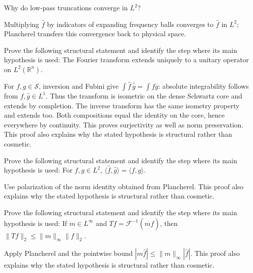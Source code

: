\begin{problem}\label{prob:iii13-problem-08}
Why do low-pass truncations converge in \(L^2\)?
\end{problem}
\begin{solution}
Multiplying \(\widehat f\) by indicators of expanding frequency balls
converges to \(\widehat f\) in \(L^2\); Plancherel transfers this convergence
back to physical space.
\end{solution}

\begin{problem}\label{prob:iii13-problem-09}
Prove the following structural statement and identify the step where its main hypothesis is used: The Fourier transform extends uniquely to a unitary operator on $L^2(\mathbb R^n)$.
\end{problem}
\begin{solution}
For $f,g\in\mathcal S$, inversion and Fubini give $\int\widehat f\,\overline{\widehat g}=\int f\overline g$: absolute integrability follows from $f,\widehat g\in L^1$. Thus the transform is isometric on the dense Schwartz core and extends by completion. The inverse transform has the same isometry property and extends too. Both compositions equal the identity on the core, hence everywhere by continuity. This proves surjectivity as well as norm preservation. This proof also explains why the stated hypothesis is structural rather than cosmetic.
\end{solution}

\begin{problem}\label{prob:iii13-problem-10}
Prove the following structural statement and identify the step where its main hypothesis is used: For $f,g\in L^2$, $\langle\widehat f,\widehat g\rangle=\langle f,g\rangle$.
\end{problem}
\begin{solution}
Use polarization of the norm identity obtained from Plancherel. This proof also explains why the stated hypothesis is structural rather than cosmetic.
\end{solution}

\begin{problem}\label{prob:iii13-problem-11}
Prove the following structural statement and identify the step where its main hypothesis is used: If $m\in L^\infty$ and $Tf=\mathcal F^{-1}(m\widehat f)$, then $\|Tf\|_2\le\|m\|_\infty\|f\|_2$.
\end{problem}
\begin{solution}
Apply Plancherel and the pointwise bound $|m\widehat f|\le\|m\|_\infty|\widehat f|$. This proof also explains why the stated hypothesis is structural rather than cosmetic.
\end{solution}

